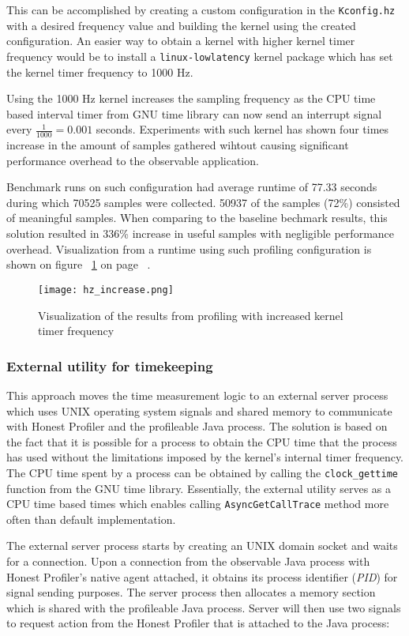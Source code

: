 \documentclass[..thesis.tex]{subfiles}
\begin{document}
This can be accomplished by creating a custom configuration in the \texttt{Kconfig.hz} with a desired frequency value and building the kernel using the created configuration. An easier way to obtain a kernel with higher kernel timer frequency would be to install a \texttt{linux-lowlatency} kernel package which has set the kernel timer frequency to 1000 Hz.

Using the 1000 Hz kernel increases the sampling frequency as the CPU time based interval timer from GNU time library can now send an interrupt signal every $\frac{1}{1000} = 0.001$ seconds. Experiments with such kernel has shown four times increase in the amount of samples gathered wihtout causing significant performance overhead to the observable application.

Benchmark runs on such configuration had average runtime of 77.33 seconds during which 70525 samples were collected. 50937 of the samples (72\%) consisted of meaningful samples. When comparing to the baseline bechmark results, this solution resulted in 336\% increase in useful samples with negligible performance overhead. Visualization from a runtime using such profiling configuration is shown on figure ~\ref{fig:hz_increase} on page ~\pageref{fig:hz_increase}.
\begin{figure}[H]
\texttt{[image: hz\_increase.png]}
\caption{Visualization of the results from profiling with increased kernel timer frequency}
\label{fig:hz_increase}
\end{figure}

\subsubsection{External utility for timekeeping}
\label{shared-mem}

This approach moves the time measurement logic to an external server process which uses UNIX operating system signals and shared memory to communicate with Honest Profiler and the profileable Java process. The solution is based on the fact that it is possible for a process to obtain the CPU time that the process has used without the limitations imposed by the kernel's internal timer frequency. The CPU time spent by a process can be obtained by calling the \texttt{clock\_\-gettime} function from the GNU time library. Essentially, the external utility serves as a CPU time based times which enables calling \texttt{Async\-Get\-Call\-Trace} method more often than default implementation.

The external server process starts by creating an UNIX domain socket and waits for a connection. Upon a connection from the observable Java process with Honest Profiler's native agent attached, it obtains its process identifier (\textit{PID}) for signal sending purposes. The server process then allocates a memory section which is shared with the profileable Java process. Server will then use two signals to request action from the Honest Profiler that is attached to the Java process:
\end{document}
